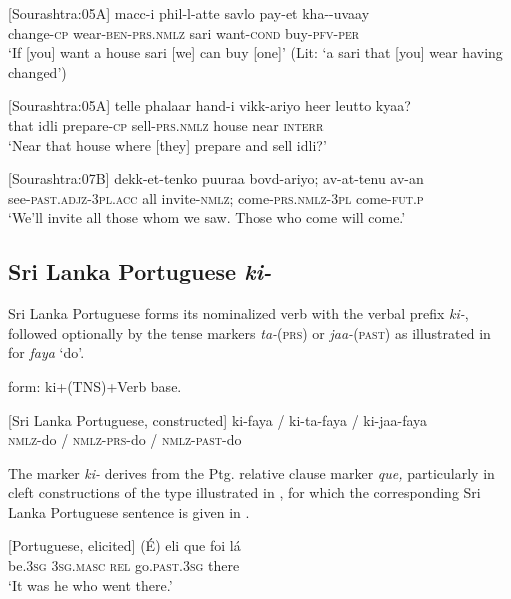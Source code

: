 \ea\label{smith:ex:42}
{}[Sourashtra:05A]
\gll macc-i        phil-l-atte savlo pay-et kha{\textrtailt}-{\textrtailt}-uvaay\\
change-\textsc{cp} wear-\textsc{ben}-\textsc{prs.nmlz} sari want-\textsc{cond} buy-\textsc{pfv}-\textsc{per}\\
`If [you] want a house sari [we] can buy [one]' (Lit: `a sari that [you] wear having changed')
\z

\ea\label{smith:ex:43}
{}[Sourashtra:05A]
\gll telle phalaar hand-i vikk-ariyo {\textscriptg}heer le{\textscriptg}utto kyaa?\\
that idli prepare-\textsc{cp} sell-\textsc{prs}.\textsc{nmlz} house near \textsc{interr}\\
`Near that house where [they] prepare and sell idli?'
\z

\ea\label{smith:ex:44}
{}[Sourashtra:07B]
\gll dekk-et-tenko puuraa bovd-ariyo; av-at-tenu av-an\\
see-\textsc{past}.\textsc{adjz}-3\textsc{pl}.\textsc{acc} all invite-\textsc{nmlz}; come-\textsc{prs}.\textsc{nmlz}-3\textsc{pl} come-\textsc{fut}.\textsc{p}\\
`We'll invite all those whom we saw. Those who come will come.'
\z

\subsection{Sri Lanka Portuguese \textit{ki-}}

Sri Lanka Portuguese forms its nominalized verb with the verbal prefix \textit{ki-}, followed optionally by the tense markers \textit{ta-}(\textsc{prs}) or \textit{jaa-}(\textsc{past}) as illustrated in  for \textit{faya} `do'.

form: ki+(TNS)+Verb base. 

\ea\label{smith:ex:45}
{}[Sri Lanka Portuguese, constructed]
\gll ki-faya / ki-ta-faya / ki-jaa-faya \\
\textsc{nmlz}-do / \textsc{nmlz}-\textsc{prs}-do / \textsc{nmlz}-\textsc{past}-do\\
\z

The marker \textit{ki-} derives from the Ptg. relative clause marker \textit{que, }particularly in cleft constructions of the type\textit{ }illustrated in , for which the corresponding Sri Lanka Portuguese sentence is given in . 

\ea\label{smith:ex:46}
{}[Portuguese, elicited]
\gll (\'E) eli que foi l\'a\\
be.3\textsc{sg} 3\textsc{sg}.\textsc{masc} \textsc{rel} go.\textsc{past}.3\textsc{sg} there\\
`It was he who went there.'
\z

